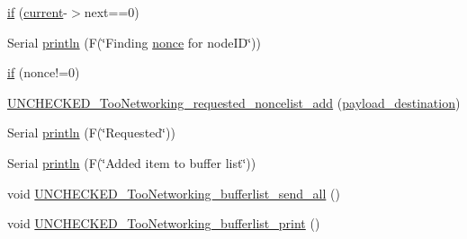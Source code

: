 \begin{DoxyCompactItemize}
\item 
\hyperlink{group__UNCHECKED__TooNetworking__SIMPLE__BUFFER_ga2f4038fd75613a849c672d716d7bf310}{if} (\hyperlink{group__UNCHECKED__TooNetworking__SIMPLE__BUFFER_gae8b515cceb310a575b6c2677ba93ea7e}{current}-\/$>$next==0)
\item 
Serial \hyperlink{group__UNCHECKED__TooNetworking__SIMPLE__BUFFER_gac21086f77b99f6a32b5f454bae30cd29}{println} (F(\char`\"{}Finding \hyperlink{group__UNCHECKED__TooNetworking__SIMPLE__BUFFER_ga8fc64ce47dc28f47b3317ae1051e4359}{nonce} for node\+ID\char`\"{}))
\item 
\hyperlink{group__UNCHECKED__TooNetworking__SIMPLE__BUFFER_gaaf318681cf7c6b13563cc7b4c1dea447}{if} (nonce!=0)
\item 
\hyperlink{group__UNCHECKED__TooNetworking__SIMPLE__BUFFER_ga20f1ad74f3801f9389cb3315df4bbc18}{U\+N\+C\+H\+E\+C\+K\+E\+D\+\_\+\+Too\+Networking\+\_\+requested\+\_\+noncelist\+\_\+add} (\hyperlink{group__UNCHECKED__TooNetworking__SIMPLE__BUFFER_ga76db772dc25d4b2f5eb800e93ca3fd0b}{payload\+\_\+destination})
\item 
Serial \hyperlink{group__UNCHECKED__TooNetworking__SIMPLE__BUFFER_ga12135b0b718c52a4bc16710717109de8}{println} (F(\char`\"{}Requested\char`\"{}))
\item 
Serial \hyperlink{group__UNCHECKED__TooNetworking__SIMPLE__BUFFER_ga00890a1640039d4f6a925b290994a004}{println} (F(\char`\"{}Added item to buffer list\char`\"{}))
\item 
void \hyperlink{group__UNCHECKED__TooNetworking__SIMPLE__BUFFER_gaa0c4d89eca1353756e8e8b6f06b409d1}{U\+N\+C\+H\+E\+C\+K\+E\+D\+\_\+\+Too\+Networking\+\_\+bufferlist\+\_\+send\+\_\+all} ()
\item 
void \hyperlink{group__UNCHECKED__TooNetworking__SIMPLE__BUFFER_gafadf7dbd1a65971db7df09fb00e68680}{U\+N\+C\+H\+E\+C\+K\+E\+D\+\_\+\+Too\+Networking\+\_\+bufferlist\+\_\+print} ()
\end{DoxyCompactItemize}
